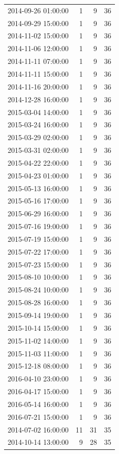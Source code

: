 \begin{tabular}{lrrr}
2014-09-26 01:00:00 & 1 & 9 & 36 \\
2014-09-29 15:00:00 & 1 & 9 & 36 \\
2014-11-02 15:00:00 & 1 & 9 & 36 \\
2014-11-06 12:00:00 & 1 & 9 & 36 \\
2014-11-11 07:00:00 & 1 & 9 & 36 \\
2014-11-11 15:00:00 & 1 & 9 & 36 \\
2014-11-16 20:00:00 & 1 & 9 & 36 \\
2014-12-28 16:00:00 & 1 & 9 & 36 \\
2015-03-04 14:00:00 & 1 & 9 & 36 \\
2015-03-24 16:00:00 & 1 & 9 & 36 \\
2015-03-29 02:00:00 & 1 & 9 & 36 \\
2015-03-31 02:00:00 & 1 & 9 & 36 \\
2015-04-22 22:00:00 & 1 & 9 & 36 \\
2015-04-23 01:00:00 & 1 & 9 & 36 \\
2015-05-13 16:00:00 & 1 & 9 & 36 \\
2015-05-16 17:00:00 & 1 & 9 & 36 \\
2015-06-29 16:00:00 & 1 & 9 & 36 \\
2015-07-16 19:00:00 & 1 & 9 & 36 \\
2015-07-19 15:00:00 & 1 & 9 & 36 \\
2015-07-22 17:00:00 & 1 & 9 & 36 \\
2015-07-23 15:00:00 & 1 & 9 & 36 \\
2015-08-10 10:00:00 & 1 & 9 & 36 \\
2015-08-24 10:00:00 & 1 & 9 & 36 \\
2015-08-28 16:00:00 & 1 & 9 & 36 \\
2015-09-14 19:00:00 & 1 & 9 & 36 \\
2015-10-14 15:00:00 & 1 & 9 & 36 \\
2015-11-02 14:00:00 & 1 & 9 & 36 \\
2015-11-03 11:00:00 & 1 & 9 & 36 \\
2015-12-18 08:00:00 & 1 & 9 & 36 \\
2016-04-10 23:00:00 & 1 & 9 & 36 \\
2016-04-17 15:00:00 & 1 & 9 & 36 \\
2016-05-14 16:00:00 & 1 & 9 & 36 \\
2016-07-21 15:00:00 & 1 & 9 & 36 \\
2014-07-02 16:00:00 & 11 & 31 & 35 \\
2014-10-14 13:00:00 & 9 & 28 & 35 \\

\end{tabular}
